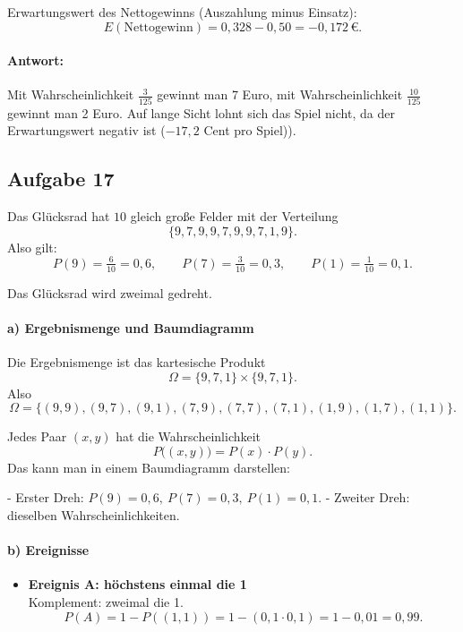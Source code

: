 \documentclass[11pt,a4paper,oneside]{article}
\begin{document}
\begin{loesung}{}
		Erwartungswert des Nettogewinns (Auszahlung minus Einsatz):
		\[
		E(\text{Nettogewinn}) = 0{,}328 - 0{,}50 = -0{,}172 \,€.
		\]
		
		\paragraph{Antwort:}
		Mit Wahrscheinlichkeit \(\tfrac{3}{125}\) gewinnt man 7 Euro, mit Wahrscheinlichkeit \(\tfrac{10}{125}\) gewinnt man 2 Euro.  
		Auf lange Sicht lohnt sich das Spiel nicht, da der Erwartungswert negativ ist (\(-17{,}2\) Cent pro Spiel)).
	\end{loesung}
	
	\newpage
	
	\begin{loesung}{}
		\subsection*{Aufgabe 17}
		Das Glücksrad hat \(10\) gleich große Felder mit der Verteilung
		\[
		\{9,7,9,9,7,9,9,7,1,9\}.
		\]
		Also gilt:
		\[
		P(9)=\tfrac{6}{10}=0{,}6,\qquad
		P(7)=\tfrac{3}{10}=0{,}3,\qquad
		P(1)=\tfrac{1}{10}=0{,}1.
		\]
		
		Das Glücksrad wird zweimal gedreht. 
		
		\paragraph{a) Ergebnismenge und Baumdiagramm}
		Die Ergebnismenge ist das kartesische Produkt
		\[
		\Omega=\{9,7,1\}\times\{9,7,1\}.
		\]
		Also
		\[
		\Omega=\{(9,9),(9,7),(9,1),(7,9),(7,7),(7,1),(1,9),(1,7),(1,1)\}.
		\]
		
		Jedes Paar \((x,y)\) hat die Wahrscheinlichkeit
		\[
		P\big((x,y)\big)=P(x)\cdot P(y).
		\]
		Das kann man in einem Baumdiagramm darstellen:
		
		- Erster Dreh: \(P(9)=0{,}6,\ P(7)=0{,}3,\ P(1)=0{,}1\).  
		- Zweiter Dreh: dieselben Wahrscheinlichkeiten.
		
		\paragraph{b) Ereignisse}
		
		\begin{itemize}
			\item \textbf{Ereignis A: höchstens einmal die 1}\\
			Komplement: zweimal die 1.  
			\[
			P(A)=1-P((1,1))=1-(0{,}1\cdot 0{,}1)=1-0{,}01=0{,}99.
			\]
			

\end{itemize}
\end{loesung}
\end{document}
